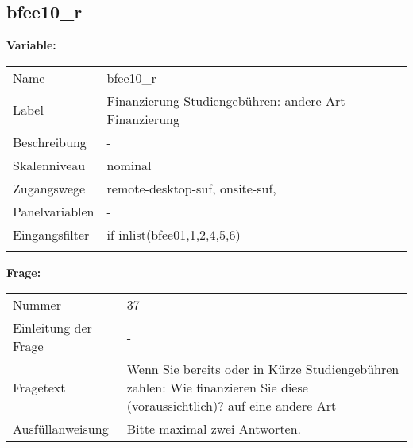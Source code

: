 	
	
	\subsection{bfee10\_r}
	\label{subSection:bfee10_r}

	\noindent\textbf{Variable:}\\
		\begin{tabular}{lL{11.3cm}}
			\label{tableVariable:bfee10_r}
			Name & bfee10\_r \\
			Label & Finanzierung Studiengebühren: andere Art Finanzierung \\
			Beschreibung & - \\
			Skalenniveau & nominal \\
			Zugangswege &
				remote-desktop-suf,
				onsite-suf,
 \\
			Panelvariablen & -
			 \\
			Eingangsfilter & if inlist(bfee01,1,2,4,5,6) \\
 \\
		\end{tabular}

		\vspace*{1 cm}
		\noindent\textbf{Frage:}\\
		\begin{tabular}{lL{11.3cm}}
			\label{tableQuestion:bfee10_r}
			Nummer & 37 \\
			Einleitung der Frage & - \\
			Fragetext & Wenn Sie bereits oder in Kürze Studiengebühren zahlen: Wie finanzieren Sie diese (voraussichtlich)?
auf eine andere Art \\
			Ausfüllanweisung & Bitte maximal zwei Antworten. \\
		\end{tabular}





